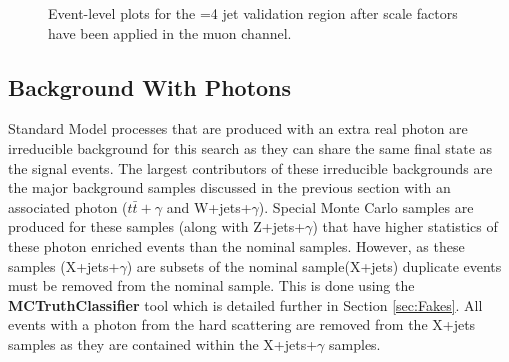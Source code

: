 \begin{figure}[h!]
\hfil  %
\caption{Event-level plots for the =4 jet validation region after scale factors have been applied in the muon channel.}
\label{fig:VR3mujpostscale}
\end{figure}



\subsection{Background With Photons}
\label{sec:BKGPho}

Standard Model processes that are produced with an extra real photon are irreducible background for this search as they can share the same final state as the signal events.  The largest contributors of these irreducible backgrounds are the major background samples discussed in the previous section with an associated photon ($t\bar{t}+\gamma$ and W+jets+$\gamma$).  Special Monte Carlo samples are produced for these samples (along with Z+jets+$\gamma$) that have higher statistics of these photon enriched events than the nominal samples.  However, as these samples (X+jets+$\gamma$) are subsets of the nominal sample(X+jets) duplicate events must be removed from the nominal sample.  This is done using the \textbf{MCTruthClassifier} tool which is detailed further in Section \ref{sec:Fakes}.  All events with a photon from the hard scattering are removed from the X+jets samples as they are contained within the X+jets+$\gamma$ samples.
